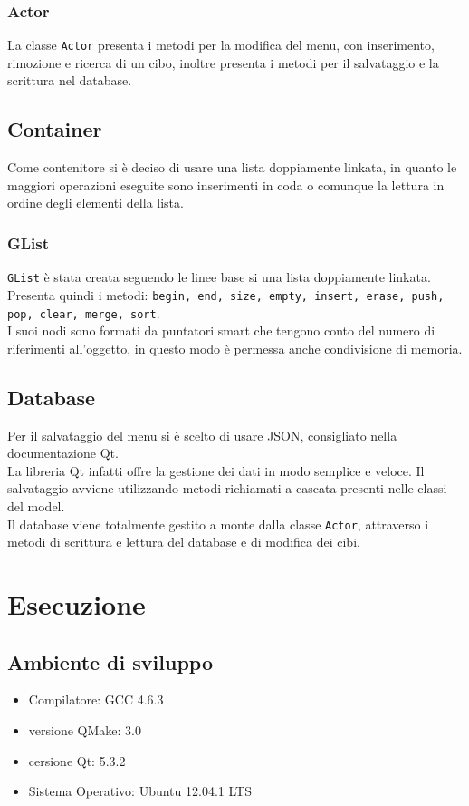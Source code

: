 \documentclass[]{report}   %
\begin{document}
\subsection{Actor}
La classe \texttt{Actor} presenta i metodi per la modifica del menu, con inserimento, rimozione e ricerca di un cibo, inoltre presenta i metodi per il salvataggio e la scrittura nel database.

\section{Container}     				%
Come contenitore si è deciso di usare una lista doppiamente linkata, in quanto le maggiori operazioni eseguite sono inserimenti in coda o comunque la lettura in ordine degli elementi della lista.
\subsection{GList}
\texttt{GList} è stata creata seguendo le linee base si una lista doppiamente linkata.\\
Presenta quindi i metodi: \texttt{begin, end, size, empty, insert, erase, push, pop, clear, merge, sort}.\\
I suoi nodi sono formati da puntatori smart che tengono conto del numero di riferimenti all'oggetto, in questo modo è permessa anche condivisione di memoria.
\section{Database}
Per il salvataggio del menu si è scelto di usare JSON, consigliato nella documentazione Qt.\\
La libreria Qt infatti offre la gestione dei dati in modo semplice e veloce. Il salvataggio avviene utilizzando metodi richiamati a cascata presenti nelle classi del model.\\
Il database viene totalmente gestito a monte dalla classe \texttt{Actor}, attraverso i metodi di scrittura e lettura del database e di modifica dei cibi.

\chapter{Esecuzione}           			%
\section{Ambiente di sviluppo}     		%
\begin{itemize}
\item Compilatore: GCC 4.6.3
\item versione QMake: 3.0
\item cersione Qt: 5.3.2
\item Sistema Operativo: Ubuntu 12.04.1 LTS
\end{itemize}
\end{document}
